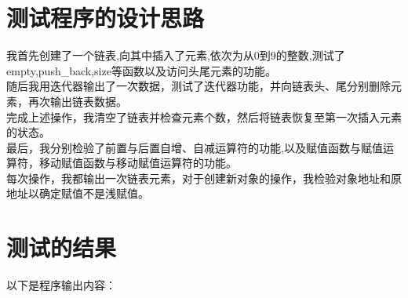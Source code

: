 \documentclass[UTF8]{ctexart}
\begin{document}
\pagestyle{fancy}
\fancyhead{}

\section{测试程序的设计思路}

我首先创建了一个链表,向其中插入了元素,依次为从0到9的整数,测试了empty,push\_back,size等函数以及访问头尾元素的功能。\\
随后我用迭代器输出了一次数据，测试了迭代器功能，并向链表头、尾分别删除元素，再次输出链表数据。\\
完成上述操作，我清空了链表并检查元素个数，然后将链表恢复至第一次插入元素的状态。\\
最后，我分别检验了前置与后置自增、自减运算符的功能,以及赋值函数与赋值运算符，移动赋值函数与移动赋值运算符的功能。\\
每次操作，我都输出一次链表元素，对于创建新对象的操作，我检验对象地址和原地址以确定赋值不是浅赋值。\\
\section{测试的结果}
以下是程序输出内容：\\
\end{document}
